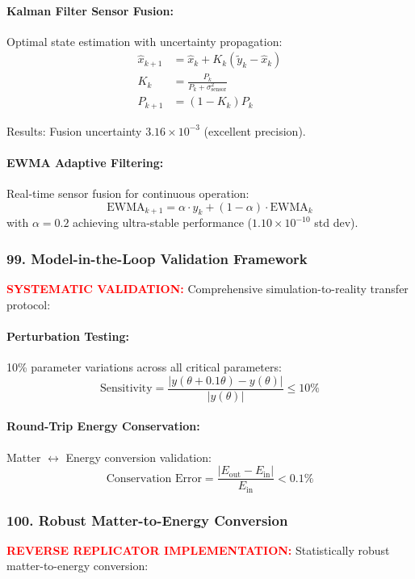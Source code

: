 \documentclass[11pt]{article}
\begin{document}
\paragraph{Kalman Filter Sensor Fusion:}
Optimal state estimation with uncertainty propagation:
\[
  \boxed{\begin{aligned}
    \hat{x}_{k+1} &= \hat{x}_k + K_k(\tilde{y}_k - \hat{x}_k) \\
    K_k &= \frac{P_k}{P_k + \sigma_{\text{sensor}}^2} \\
    P_{k+1} &= (1 - K_k)P_k
  \end{aligned}}
\]

Results: Fusion uncertainty $3.16 \times 10^{-3}$ (excellent precision).

\paragraph{EWMA Adaptive Filtering:}
Real-time sensor fusion for continuous operation:
\[
  \text{EWMA}_{k+1} = \alpha \cdot y_k + (1-\alpha) \cdot \text{EWMA}_k
\]
with $\alpha = 0.2$ achieving ultra-stable performance ($1.10 \times 10^{-10}$ std dev).

\subsubsection*{99. Model-in-the-Loop Validation Framework}
\textcolor{red}{\textbf{SYSTEMATIC VALIDATION:}} Comprehensive simulation-to-reality transfer protocol:

\paragraph{Perturbation Testing:}
10\% parameter variations across all critical parameters:
\[
  \text{Sensitivity} = \frac{|y(\theta + 0.1\theta) - y(\theta)|}{|y(\theta)|} \leq 10\%
\]

\paragraph{Round-Trip Energy Conservation:}
Matter $\leftrightarrow$ Energy conversion validation:
\[
  \text{Conservation Error} = \frac{|E_{\text{out}} - E_{\text{in}}|}{E_{\text{in}}} < 0.1\%
\]

\subsubsection*{100. Robust Matter-to-Energy Conversion}
\textcolor{red}{\textbf{REVERSE REPLICATOR IMPLEMENTATION:}} Statistically robust matter-to-energy conversion:
\end{document}
